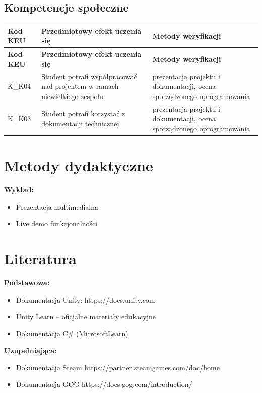\documentclass[12pt, a4paper]{article}
\newcommand{\thdrule}{\noalign{\global\setlength{\extrarowheight}{0pt}}}
\newcommand{\thdend}{\noalign{\global\setlength{\extrarowheight}{3pt}}}
\begin{document}
\subsection*{Kompetencje społeczne}
{\scriptsize
\begin{longtable}{m{1.6cm}m{9.0cm}m{4.2cm}}
\thdrule\toprule
\rowcolor{pjatkRed} {\color{white}\footnotesize\textbf{\vphantom{Ag}Kod KEU}} & {\color{white}\footnotesize\textbf{\vphantom{Ag}Przedmiotowy efekt uczenia się}} & {\color{white}\footnotesize\textbf{\vphantom{Ag}Metody weryfikacji}} \\
\midrule\thdend
\endfirsthead
\thdrule\toprule
\rowcolor{pjatkRed} {\color{white}\footnotesize\textbf{\vphantom{Ag}Kod KEU}} & {\color{white}\footnotesize\textbf{\vphantom{Ag}Przedmiotowy efekt uczenia się}} & {\color{white}\footnotesize\textbf{\vphantom{Ag}Metody weryfikacji}} \\
\midrule\thdend
\endhead
  \rowcolor{tableRowLight} K\_K04 & Student potrafi współpracować nad projektem w ramach niewielkiego zespołu & prezentacja projektu i dokumentacji, ocena sporządzonego oprogramowania \\
  \rowcolor{tableRowAlt} K\_K03 & Student potrafi korzystać z dokumentacji technicznej & prezentacja projektu i dokumentacji, ocena sporządzonego oprogramowania \\
\bottomrule
\end{longtable}}

\section{Metody dydaktyczne}

\textbf{Wykład:}
\begin{itemize}
  \item Prezentacja multimedialna
  \item Live demo funkcjonalności
\end{itemize}
\vspace{4pt}


\section{Literatura}

\textbf{Podstawowa:}
\begin{itemize}
  \item Dokumentacja Unity: https://docs.unity.com
  \item Unity Learn – oficjalne materiały edukacyjne
  \item Dokumentacja C\# (MicrosoftLearn)
\end{itemize}

\textbf{Uzupełniająca:}
\begin{itemize}
  \item Dokumentacja Steam https://partner.steamgames.com/doc/home
  \item Dokumentacja GOG https://docs.gog.com/introduction/
\end{itemize}
\end{document}
